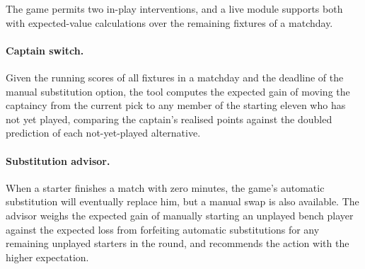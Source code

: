 The game permits two in-play interventions, and a live module
supports both with expected-value calculations over the remaining
fixtures of a matchday.

\paragraph{Captain switch.}
Given the running scores of all fixtures in a matchday and the
deadline of the manual substitution option, the tool computes the
expected gain of moving the captaincy from the current pick to any
member of the starting eleven who has not yet played, comparing the
captain's realised points against the doubled prediction of each
not-yet-played alternative.

\paragraph{Substitution advisor.}
When a starter finishes a match with zero minutes, the game's
automatic substitution will eventually replace him, but a manual swap
is also available. The advisor weighs the expected gain of manually
starting an unplayed bench player against the expected loss from
forfeiting automatic substitutions for any remaining unplayed
starters in the round, and recommends the action with the higher
expectation.
